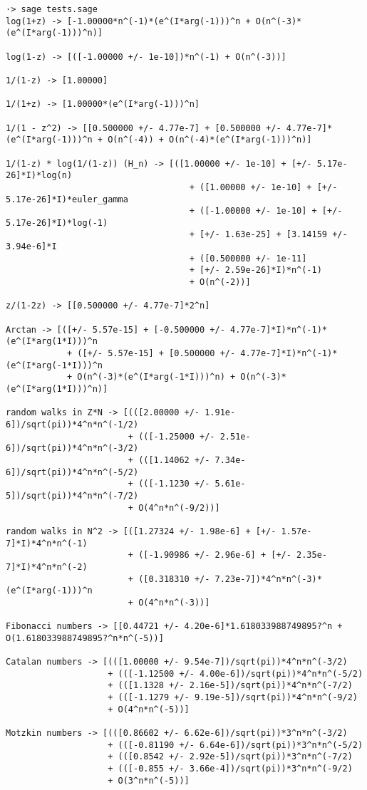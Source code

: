 \documentclass[../main.tex]{subfiles}
\begin{document}
\begin{verbatim}
·> sage tests.sage
log(1+z) -> [-1.00000*n^(-1)*(e^(I*arg(-1)))^n + O(n^(-3)*(e^(I*arg(-1)))^n)]

log(1-z) -> [([-1.00000 +/- 1e-10])*n^(-1) + O(n^(-3))]

1/(1-z) -> [1.00000]

1/(1+z) -> [1.00000*(e^(I*arg(-1)))^n]

1/(1 - z^2) -> [[0.500000 +/- 4.77e-7] + [0.500000 +/- 4.77e-7]*(e^(I*arg(-1)))^n + O(n^(-4)) + O(n^(-4)*(e^(I*arg(-1)))^n)]

1/(1-z) * log(1/(1-z)) (H_n) -> [([1.00000 +/- 1e-10] + [+/- 5.17e-26]*I)*log(n)
									+ ([1.00000 +/- 1e-10] + [+/- 5.17e-26]*I)*euler_gamma
									+ ([-1.00000 +/- 1e-10] + [+/- 5.17e-26]*I)*log(-1)
									+ [+/- 1.63e-25] + [3.14159 +/- 3.94e-6]*I
									+ ([0.500000 +/- 1e-11]
									+ [+/- 2.59e-26]*I)*n^(-1)
									+ O(n^(-2))]

z/(1-2z) -> [[0.500000 +/- 4.77e-7]*2^n]

Arctan -> [([+/- 5.57e-15] + [-0.500000 +/- 4.77e-7]*I)*n^(-1)*(e^(I*arg(1*I)))^n
			+ ([+/- 5.57e-15] + [0.500000 +/- 4.77e-7]*I)*n^(-1)*(e^(I*arg(-1*I)))^n
			+ O(n^(-3)*(e^(I*arg(-1*I)))^n) + O(n^(-3)*(e^(I*arg(1*I)))^n)]

random walks in Z*N -> [(([2.00000 +/- 1.91e-6])/sqrt(pi))*4^n*n^(-1/2)
						+ (([-1.25000 +/- 2.51e-6])/sqrt(pi))*4^n*n^(-3/2)
						+ (([1.14062 +/- 7.34e-6])/sqrt(pi))*4^n*n^(-5/2)
						+ (([-1.1230 +/- 5.61e-5])/sqrt(pi))*4^n*n^(-7/2)
						+ O(4^n*n^(-9/2))]

random walks in N^2 -> [([1.27324 +/- 1.98e-6] + [+/- 1.57e-7]*I)*4^n*n^(-1)
						+ ([-1.90986 +/- 2.96e-6] + [+/- 2.35e-7]*I)*4^n*n^(-2)
						+ ([0.318310 +/- 7.23e-7])*4^n*n^(-3)*(e^(I*arg(-1)))^n
						+ O(4^n*n^(-3))]

Fibonacci numbers -> [[0.44721 +/- 4.20e-6]*1.618033988749895?^n + O(1.618033988749895?^n*n^(-5))]

Catalan numbers -> [(([1.00000 +/- 9.54e-7])/sqrt(pi))*4^n*n^(-3/2)
					+ (([-1.12500 +/- 4.00e-6])/sqrt(pi))*4^n*n^(-5/2)
					+ (([1.1328 +/- 2.16e-5])/sqrt(pi))*4^n*n^(-7/2)
					+ (([-1.1279 +/- 9.19e-5])/sqrt(pi))*4^n*n^(-9/2)
					+ O(4^n*n^(-5))]

Motzkin numbers -> [(([0.86602 +/- 6.62e-6])/sqrt(pi))*3^n*n^(-3/2)
					+ (([-0.81190 +/- 6.64e-6])/sqrt(pi))*3^n*n^(-5/2)
					+ (([0.8542 +/- 2.92e-5])/sqrt(pi))*3^n*n^(-7/2)
					+ (([-0.855 +/- 3.66e-4])/sqrt(pi))*3^n*n^(-9/2)
					+ O(3^n*n^(-5))]


\end{verbatim}
\end{document}
